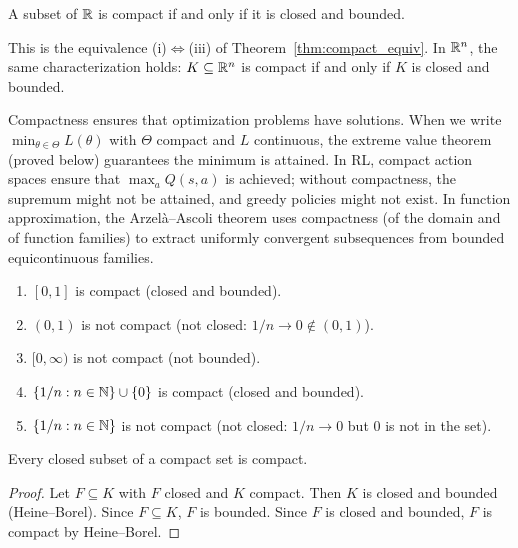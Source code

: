 \documentclass[11pt,a4paper]{article}
\begin{document}
\begin{keyresult}[title={Heine--Borel Theorem}]
\begin{corollary}
\label{cor:heine_borel}
A subset of $\mathbb{R}$ is compact if and only if it is closed and bounded.
\end{corollary}
This is the equivalence (i)$\Leftrightarrow$(iii) of
Theorem~\ref{thm:compact_equiv}. In $\mathbb{R}^n$, the same characterization
holds: $K \subseteq \mathbb{R}^n$ is compact if and only if $K$ is closed and
bounded.
\end{keyresult}

\begin{rlconnection}[title={Compactness in optimization and function approximation}]
Compactness ensures that optimization problems have solutions. When we
write $\min_{\theta \in \Theta} L(\theta)$ with $\Theta$ compact and $L$
continuous, the extreme value theorem (proved below) guarantees the minimum
is attained. In RL, compact action spaces ensure that
$\max_a Q(s,a)$ is achieved; without compactness, the supremum might not be
attained, and greedy policies might not exist. In function approximation,
the Arzel\`{a}--Ascoli theorem uses compactness (of the domain and of
function families) to extract uniformly convergent subsequences from bounded
equicontinuous families.
\end{rlconnection}

\begin{example}
\label{ex:compact_sets}
\begin{enumerate}[nosep,label=(\alph*)]
  \item $[0, 1]$ is compact (closed and bounded).
  \item $(0, 1)$ is not compact (not closed: $1/n \to 0 \notin (0,1)$).
  \item $[0, \infty)$ is not compact (not bounded).
  \item $\{1/n : n \in \mathbb{N}\} \cup \{0\}$ is compact (closed and bounded).
  \item $\{1/n : n \in \mathbb{N}\}$ is not compact (not closed: $1/n \to 0$
    but $0$ is not in the set).
\end{enumerate}
\end{example}

\begin{proposition}
\label{prop:closed_subset_compact}
Every closed subset of a compact set is compact.
\end{proposition}

\begin{proof}
Let $F \subseteq K$ with $F$ closed and $K$ compact. Then $K$ is closed
and bounded (Heine--Borel). Since $F \subseteq K$, $F$ is bounded. Since
$F$ is closed and bounded, $F$ is compact by Heine--Borel.
\end{proof}
\end{document}
